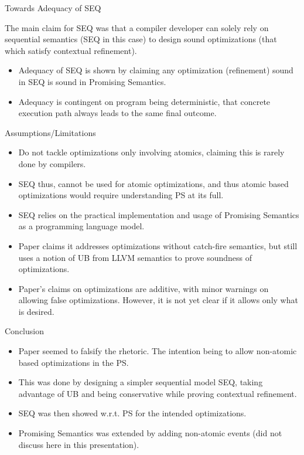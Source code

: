 \documentclass[xcolor=dvipsnames, notes]{beamer}
\begin{document}
    \begin{frame}{Towards Adequacy of SEQ}

        The main claim for SEQ was that a compiler developer can solely rely on sequential semantics (SEQ in this case) to design sound optimizations (that which satisfy contextual refinement). 
        \begin{itemize}
            \item Adequacy of SEQ is shown by claiming any optimization (refinement) sound in SEQ is sound in Promising Semantics.
            \item Adequacy is contingent on program being deterministic, that concrete execution path always leads to the same final outcome.
        \end{itemize}
        
    \end{frame}

    \begin{frame}{Assumptions/Limitations}

        \begin{itemize}
            \item Do not tackle optimizations only involving atomics, claiming this is rarely done by compilers. 
            \item SEQ thus, cannot be used for atomic optimizations, and thus atomic based optimizations would require understanding PS at its full.
            \item SEQ relies on the practical implementation and usage of Promising Semantics as a programming language model.
            \item Paper claims it addresses optimizations without catch-fire semantics, but still uses a notion of UB from LLVM semantics to prove soundness of optimizations. 
            \item Paper's claims on optimizations are additive, with minor warnings on allowing false optimizations. However, it is not yet clear if it allows only what is desired.
        \end{itemize}
        
    \end{frame}

    \begin{frame}{Conclusion}

        \begin{itemize}
            \item Paper seemed to falsify the rhetoric. The intention being to allow non-atomic based optimizations in the PS. 
            \item This was done by designing a simpler sequential model SEQ, taking advantage of UB and being conservative while proving contextual refinement. 
            \item SEQ was then showed  w.r.t. PS for the intended optimizations.
            \item Promising Semantics was extended by adding non-atomic events (did not discuss here in this presentation).
        \end{itemize}
        
    \end{frame}
\end{document}
